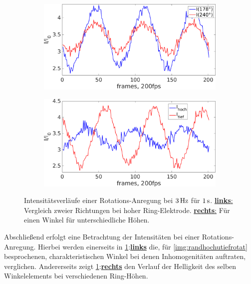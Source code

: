 \documentclass[numbers=noenddot,a4paper]{scrartcl}
\newcommand{\fett}[1]{\textbf{#1}}
\begin{document}
						\begin{figure}[!b]
							\centering
							\begin{subfigure}{0.49\textwidth}
								\centering
								\includegraphics[width=\textwidth,height=0.6\textwidth]{figs/auswertung/intensrotathoch178u2402Hz1sek.png}
							\end{subfigure}
							\begin{subfigure}{0.49\textwidth}
								\centering
								\includegraphics[width=\textwidth,height=0.6\textwidth]{figs/auswertung/intensrotathochutief1783Hz1sek.png}
							\end{subfigure}
							\caption{Intensitätsverläufe einer Rotations-Anregung bei $\unit[3]{Hz}$ für $\unit[1]{s}$. \underline{\fett{links}:} Vergleich zweier Richtungen bei hoher Ring-Elektrode. \underline{\fett{rechts}:} Für einen Winkel für unterschiedliche Höhen.}\label{img:intensrotathochutief}
						\end{figure}

					Abschließend erfolgt eine Betrachtung der Intensitäten bei einer Rotations-Anregung. Hierbei werden einerseits in \ref{img:intensrotathochutief}:\underline{\fett{links}} die, für \ref{img:randhochutiefrotat} besprochenen, charakteristischen Winkel bei denen Inhomogenitäten auftraten, verglichen. Andererseits zeigt \ref{img:intensrotathochutief}:\underline{\fett{rechts}} den Verlauf der Helligkeit des selben Winkelelements bei verschiedenen Ring-Höhen. 
\end{document}
